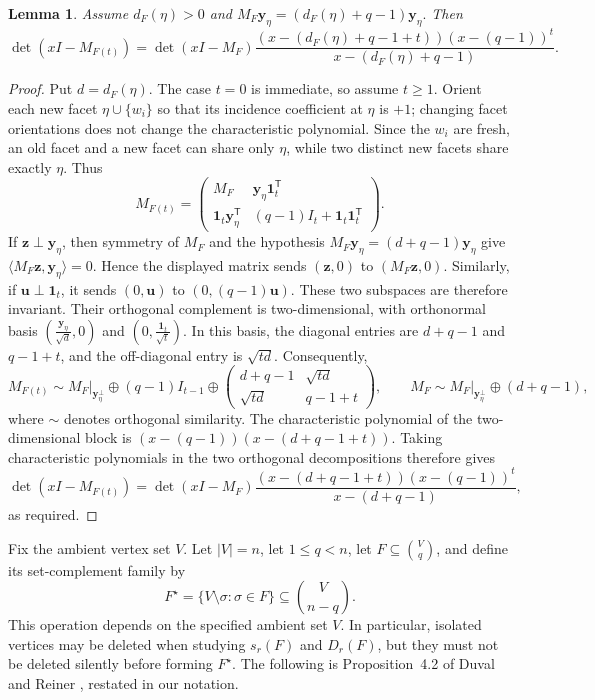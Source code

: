 \documentclass[11pt]{article}
\newtheorem{lemma}[theorem]{Lemma}
\begin{document}
	\begin{lemma}\label{lem:ridge-transfer}
		Assume \(d_F(\eta)>0\) and $
		M_F\mathbf y_\eta=(d_F(\eta)+q-1)\mathbf y_\eta.$
		Then
		\[
		\det(xI-M_{F(t)})
		=\det(xI-M_F)
		\frac{(x-(d_F(\eta)+q-1+t))(x-(q-1))^t}
		{x-(d_F(\eta)+q-1)}.
		\]
	\end{lemma}
\begin{proof}
Put \(d=d_F(\eta)\). The case \(t=0\) is immediate, so assume
\(t\geq1\). Orient each new facet \(\eta\cup\{w_i\}\) so that its
incidence coefficient at \(\eta\) is \(+1\); changing facet orientations
does not change the characteristic polynomial. Since the \(w_i\) are
fresh, an old facet and a new facet can share only \(\eta\), while two
distinct new facets share exactly \(\eta\). Thus
\[
M_{F(t)}
=
\begin{pmatrix}
M_F&\mathbf y_\eta\mathbf 1_t^{\mathsf T}\\
\mathbf 1_t\mathbf y_\eta^{\mathsf T}
&(q-1)I_t+\mathbf 1_t\mathbf 1_t^{\mathsf T}
\end{pmatrix}.
\]
If \(\mathbf z\perp\mathbf y_\eta\), then symmetry of \(M_F\) and the
hypothesis \(M_F\mathbf y_\eta=(d+q-1)\mathbf y_\eta\) give
\(\langle M_F\mathbf z,\mathbf y_\eta\rangle=0\). Hence the displayed
matrix sends \((\mathbf z,0)\) to \((M_F\mathbf z,0)\). Similarly, if
\(\mathbf u\perp\mathbf 1_t\), it sends \((0,\mathbf u)\) to
\((0,(q-1)\mathbf u)\). These two subspaces are therefore invariant.
Their orthogonal complement is two-dimensional, with orthonormal basis
$\left(\frac{\mathbf y_\eta}{\sqrt d},0\right)$ and $
\left(0,\frac{\mathbf 1_t}{\sqrt t}\right).$
In this basis, the diagonal entries are \(d+q-1\) and \(q-1+t\), and
the off-diagonal entry is \(\sqrt{td}\). Consequently,
\[
M_{F(t)}
\sim
\left.M_F\right|_{\mathbf y_\eta^\perp}
\oplus(q-1)I_{t-1}
\oplus
\begin{pmatrix}
d+q-1&\sqrt{td}\\
\sqrt{td}&q-1+t
\end{pmatrix},
\qquad
M_F\sim
\left.M_F\right|_{\mathbf y_\eta^\perp}\oplus(d+q-1),
\]
where \(\sim\) denotes orthogonal similarity.
The characteristic polynomial of the two-dimensional block is $
(x-(q-1))(x-(d+q-1+t)).$
Taking characteristic polynomials in the two orthogonal decompositions
therefore gives
\[
\det(xI-M_{F(t)})
=
\det(xI-M_F)
\frac{(x-(d+q-1+t))(x-(q-1))^t}
{x-(d+q-1)},
\]
as required.
\end{proof}

	

	
	Fix the ambient vertex set \(V\).  Let \(|V|=n\), let \(1\le q<n\), let
	\(F\subseteq\binom Vq\), and define its set-complement family by
	\[
	F^\star=\{V\setminus\sigma:\sigma\in F\}
	\subseteq\binom V{n-q}.
	\]
	This operation depends on the specified ambient set \(V\).  In particular,
	isolated vertices may be deleted when studying \(s_r(F)\) and \(D_r(F)\),
	but they must not be deleted silently before forming \(F^\star\).
	The following is Proposition~4.2 of Duval and Reiner
	\cite{DuvalReiner2002}, restated in our notation.
	
\end{document}

